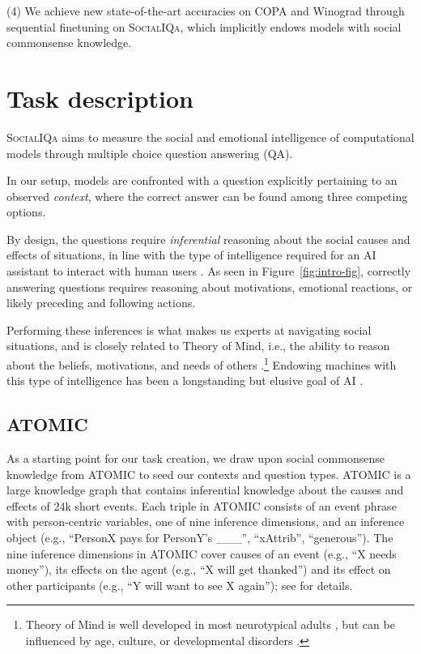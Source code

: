 (4) We achieve new state-of-the-art accuracies on COPA and Winograd through sequential finetuning on \textsc{SocialIQa}, which implicitly endows models with social commonsense knowledge.

\section{Task description}
\textsc{SocialIQa} aims to measure the social and emotional intelligence of computational models through multiple choice question answering (QA).

In our setup, models are confronted with a question explicitly pertaining to an observed \textit{context}, where the correct answer can be found among three competing options. 

By design, the questions require \textit{inferential} reasoning about the social causes and effects of situations, in line with the type of intelligence required for an AI assistant to interact with human users \citep[e.g., know to call for help when an elderly person falls; ][]{Pollack2005IntelligentTF}. As seen in Figure~\ref{fig:intro-fig}, correctly answering questions requires reasoning about motivations, emotional reactions, or likely preceding and following actions.

Performing these inferences is what makes us experts at navigating social situations, and is closely related to Theory of Mind, i.e., the ability to reason about the beliefs, motivations, and needs of others \cite{baron1985SallyAnne}.\footnote{
Theory of Mind is well developed in most neurotypical adults \cite{ganaie2015study}, but can be influenced by age, culture, or developmental disorders \cite{korkmaz2011theory}.} Endowing machines with this type of intelligence has been a longstanding but elusive goal of AI \cite{Gunning2018machineCommonsense}. 

\subsection*{ATOMIC}
As a starting point for our task creation, we draw upon social commonsense knowledge from ATOMIC \cite{sap2019atomic} to seed our contexts and question types. ATOMIC is a large knowledge graph that contains inferential knowledge about the causes and effects of 24k short events. Each triple in ATOMIC consists of an event phrase with person-centric variables, one of nine inference dimensions, and an inference object (e.g., ``PersonX pays for PersonY's \_\_\_'', ``xAttrib'', ``generous''). The nine inference dimensions in ATOMIC cover causes of an event (e.g., ``X needs money''), its effects on the agent (e.g., ``X will get thanked'') and its effect on other participants (e.g., ``Y will want to see X again''); see \citet{sap2019atomic} for details.

